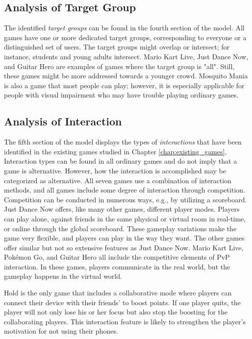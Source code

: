 \subsection{Analysis of Target Group}
The identified \textit{target groups} can be found in the fourth section of the model. All games have one or more dedicated target groups, corresponding to everyone or a distinguished set of users. The target groups might overlap or intersect; for instance, students and young adults intersect. Mario Kart Live, Just Dance Now, and Guitar Hero are examples of games where the target group is "all". Still, these games might be more addressed towards a younger crowd. Mosquito Mania is also a game that most people can play; however, it is especially applicable for people with visual impairment who may have trouble playing ordinary games.

\subsection{Analysis of Interaction}
The fifth section of the model displays the types of \textit{interactions} that have been identified in the existing games studied in Chapter \ref{chap:existing_games}. Interaction types can be found in all ordinary games and do not imply that a game is alternative. However, how the interaction is accomplished may be categorized as alternative. All seven games use a combination of interaction methods, and all games include some degree of interaction through competition. Competition can be conducted in numerous ways, e.g., by utilizing a scoreboard. Just Dance Now offers, like many other games, different player modes. Players can play alone, against friends in the same physical or virtual room in real-time, or online through the global scoreboard. These gameplay variations make the game very flexible, and players can play in the way they want. The other games offer similar but not so extensive features as Just Dance Now. Mario Kart Live, Pokémon Go, and Guitar Hero all include the competitive elements of PvP interaction. In these games, players communicate in the real world, but the gameplay happens in the virtual world.

Hold is the only game that includes a collaborative mode where players can connect their device with their friends’ to boost points. If one player quits, the player will not only lose his or her focus but also stop the boosting for the collaborating players. This interaction feature is likely to strengthen the player’s motivation for not using their phones. 

